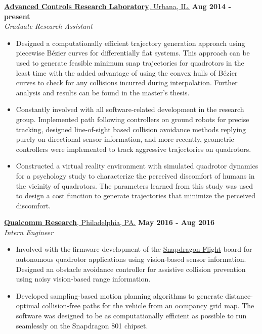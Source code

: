 \documentclass[9pt]{article}
\renewcommand{\section}[2]%
        {\pagebreak[2]\vspace{1.3\baselineskip}%
         \phantomsection\addcontentsline{toc}{section}{#1}%
         \hspace{0in}%
         \marginpar{
         \raggedright \scshape #1}#2}
\newenvironment{outerlist}[1][\enskip\textbullet]%
        {\begin{itemize}[#1]}{\end{itemize}%
         \vspace{-.6\baselineskip}}
\newcommand{\blankline}{\quad\pagebreak[2]}
\begin{document}
\section{Experience}
\href{http://naira.mechse.illinois.edu/}{\textbf{Advanced Controls Research Laboratory}, Urbana, IL.}
\hfill \textbf{Aug 2014 - }\textbf{present} \\
\textit{Graduate Research Assistant}%
\begin{outerlist}
\item Designed a computationally efficient trajectory generation approach using piecewise B\'ezier curves for differentially flat systems. This approach can be used to generate feasible minimum snap trajectories for quadrotors in the least time with the added advantage of using the convex hulls of B\'ezier curves to check for any collisions incurred during interpolation. Further analysis and results can be found in the master's thesis.
\item Constantly involved with all software-related development in the research group. Implemented path following controllers on ground robots for precise tracking, designed line-of-sight based collision avoidance methods replying purely on directional sensor information, and more recently, geometric controllers were implemented to track aggressive trajectories on quadrotors.
\item Constructed a virtual reality environment with simulated quadrotor dynamics for a psychology study to characterize the perceived discomfort of humans in the vicinity of quadrotors. The parameters learned from this study was used to design a cost function to generate trajectories that minimize the perceived discomfort.
\end{outerlist}
\blankline

\href{https://www.pennovation.upenn.edu/the-community/innovators/qualcomm-research-philadelphia}{\textbf{Qualcomm Research}, Philadelphia, PA.}
\hfill \textbf{May 2016 - Aug 2016} \\
\textit{Intern Engineer}%
\begin{outerlist}
\item Involved with the firmware development of the \href{https://developer.qualcomm.com/hardware/snapdragon-flight}{Snapdragon Flight} board for autonomous quadrotor applications using vision-based sensor information. Designed an obstacle avoidance controller for assistive collision prevention using noisy vision-based range information.
\item Developed sampling-based motion planning algorithms to generate distance-optimal collision-free paths for the vehicle from an occupancy grid map. The software was designed to be as computationally efficient as possible to run seamlessly on the Snapdragon 801 chipset.
\end{outerlist}
\blankline
\end{document}
